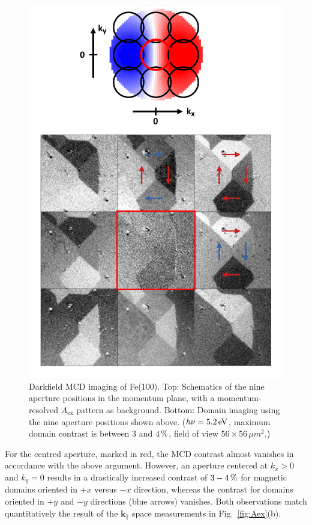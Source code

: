 \documentclass[prl,twocolumn,floatfix,superscriptaddress,aps]{revtex4-2}
\renewcommand{\vec}[1]{\boldsymbol{#1}}
\begin{document}
\begin{figure}
    \centering
    \includegraphics[width = 0.7\columnwidth]{FePaper9FelderSchema.pdf}
    \caption{Darkfield MCD imaging of Fe(100). Top: Schematics of the nine aperture positions in the momentum plane, with a momentum-resolved $A_{\mathrm{ex}}$ pattern as background. Bottom: Domain imaging using the nine aperture positions shown above. ($h \nu = \unit[5.2]{eV}$, 
    maximum domain contrast is between 3 and $\unit[4]{\%}$, field of view $56\times56\,\mu m^2$.)}
    \label{fig:Imaging}
\end{figure}

For the centred aperture, marked in red, the MCD contrast almost vanishes in accordance with the above argument. However, an aperture centered at $k_x > 0$ and $k_y = 0$ results in a drastically increased contrast of $\unit[3-4]{\%}$ for magnetic domains oriented in $+x$ versus $-x$ direction, whereas the contrast for domains oriented in $+y$ and $-y$ directions (blue arrows) vanishes. Both observations match quantitatively the result of the $\vec{k}_{\parallel}$ space measurements in Fig.~\ref{fig:Aex}(b). 
\end{document}

